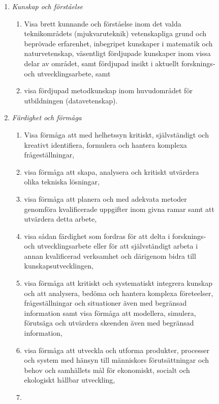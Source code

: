\begin{figure}[tp]
\begin{tcbframe}
\begin{enumerate}
\def\labelenumi{\emph{\Alph{enumi}.}}
\item \emph{Kunskap och förståelse}
  \begin{enumerate}
  \def\labelenumii{\Alph{enumi}\arabic{enumii}.}
  \tightlist
  \item
    Visa brett kunnande och förståelse inom det valda teknikområdets
    (mjukvaruteknik) vetenskapliga grund och beprövade erfarenhet,
    inbegripet kunskaper i matematik och naturvetenskap, väsentligt
    fördjupade kunskaper inom vissa delar av området, samt fördjupad
    insikt i aktuellt forsknings‐ och utvecklingsarbete, samt
  \item
    visa fördjupad metodkunskap inom huvudområdet för utbildningen
    (datavetenskap).
  \end{enumerate}
\item \emph{Färdighet och förmåga}
  \begin{enumerate}
  \def\labelenumii{\Alph{enumi}\arabic{enumii}.}
  \tightlist
  \item
    Visa förmåga att med helhetssyn kritiskt, självständigt och kreativt
    identifiera, formulera och hantera komplexa frågeställningar, 
  \item
    visa förmåga att skapa, analysera och kritiskt utvärdera olika
    tekniska lösningar, 
  \item
    visa förmåga att planera och med adekvata metoder genomföra
    kvalificerade uppgifter inom givna ramar samt att utvärdera detta
    arbete, 
  \item
    visa sådan färdighet som fordras för att delta i forsknings‐ och
    utvecklingsarbete eller för att självständigt arbeta i annan
    kvalificerad verksamhet och därigenom bidra till
    kunskapsutvecklingen, 
  \item
    visa förmåga att kritiskt och systematiskt integrera kunskap och att
    analysera, bedöma och hantera komplexa företeelser, frågeställningar
    och situationer även med begränsad information samt visa förmåga att
    modellera, simulera, förutsäga och utvärdera skeenden även med
    begränsad information, 
  \item
    visa förmåga att utveckla och utforma produkter, processer och
    system med hänsyn till människors förutsättningar och behov och
    samhällets mål för ekonomiskt, socialt och ekologiskt hållbar
    utveckling, 
  \item

\end{enumerate}
\end{enumerate}
\end{tcbframe}
\end{figure}
